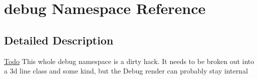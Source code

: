 \hypertarget{namespacedebug}{
\section{debug Namespace Reference}
\label{d2/dde/namespacedebug}
}


\subsection{Detailed Description}
\begin{Desc}
\item[\hyperlink{todo__todo000012}{Todo}]This whole debug namespace is a dirty hack. It needs to be broken out into a 3d line class and some kind, but the Debug render can probably stay internal \end{Desc}
